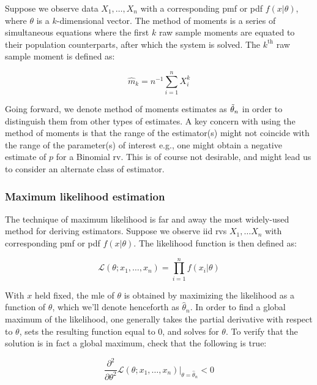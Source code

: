 \documentclass{report}
\begin{document}
Suppose we observe data $X_1, \dots, X_n$ with a corresponding \gls{pmf} or \gls{pdf} $f(x|\theta)$, where $\theta$ is a $k$-dimensional vector. The method of moments is a series of simultaneous equations where the first $k$ raw sample moments are equated to their population counterparts, after which the system is solved. The $k^{\text{th}}$ raw sample moment is defined as:

\begin{equation}\label{eq:kth-sample-moment}
    \hat{m}_k = n^{-1} \sum_{i=1}^n X_i^k
\end{equation}

Going forward, we denote method of moments estimates as $\Tilde{\theta}_n$ in order to distinguish them from other types of estimates. A key concern with using the method of moments is that the range of the estimator(s) might not coincide with the range of the parameter(s) of interest e.g., one might obtain a negative estimate of $p$ for a Binomial \gls{rv}. This is of course not desirable, and might lead us to consider an alternate class of estimator. 

\subsubsection{Maximum likelihood estimation}

The technique of maximum likelihood is far and away the most widely-used method for deriving estimators. Suppose we observe \gls{iid} \glspl{rv} $X_1, \dots X_n$ with corresponding \gls{pmf} or \gls{pdf} $f(x|\theta)$. The likelihood function is then defined as:

\begin{equation}\label{eq:likelihood-function-of-theta}
    \mathcal{L}(\theta; x_1, \dots, x_n) = \prod_{i=1}^n f(x_i|\theta)
\end{equation}

With $x$ held fixed, the \gls{mle} of $\theta$ is obtained by maximizing the likelihood as a function of $\theta$, which we'll denote henceforth as $\hat{\theta}_n$. In order to find a global maximum of the likelihood, one generally takes the partial derivative with respect to $\theta$, sets the resulting function equal to 0, and solves for $\theta$. To verify that the solution is in fact a global maximum, check that the following is true:

\begin{equation}\label{eq:likelihood-function-global-max-check}
    \frac{\partial^2}{\partial\theta^2} \mathcal{L}(\theta; x_1, \dots, x_n)|_{\theta = \hat{\theta}_n} < 0 
\end{equation}
\end{document}
